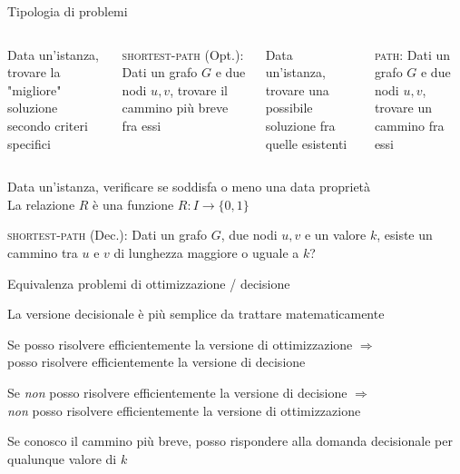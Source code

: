 \begin{frame}{Tipologia di problemi}

\small
\vspace{-9pt}
\begin{columns}[T]
\vspace{-6pt}
\BIL
\item Data un'istanza, trovare la "migliore" soluzione secondo criteri specifici
\item \alert{\textsc{shortest-path} (Opt.)}:
Dati un grafo $G$ e due nodi $u, v$,
trovare il cammino più breve fra essi
\EIL
{}
\vspace{-6pt}
\BIL
\item Data un'istanza, trovare una possibile soluzione fra quelle esistenti
\item \alert{\textsc{path}}: Dati un grafo $G$ e due nodi $u, v$, trovare un
cammino fra essi
\EIL
\end{columns}

\bigskip
{}
\vspace{-6pt}
\BIL
\item Data un'istanza, verificare se soddisfa o meno una data proprietà\\
La relazione $R$ è una funzione $R: I \rightarrow \{ 0, 1 \}$ 
\item \alert{\textsc{shortest-path} (Dec.)}: Dati un grafo $G$, due nodi $u,v$  e un valore $k$, esiste un cammino tra $u$ e $v$ di lunghezza maggiore o uguale a $k$?
\EIL


\end{frame}

\begin{frame}{Equivalenza problemi di ottimizzazione / decisione}

\BIL
\item La versione decisionale è più semplice da trattare matematicamente
\item Se posso risolvere efficientemente la versione di ottimizzazione
$\Rightarrow$ \\ posso risolvere efficientemente la versione di decisione 
\item \alert{Se \emph{non} posso risolvere efficientemente la versione di decisione
$\Rightarrow$ \\ \emph{non} posso risolvere efficientemente la versione di ottimizzazione}
\EIL

\bigskip
{}
\BIL
\item Se conosco il cammino più breve, posso rispondere alla domanda decisionale
per qualunque valore di $k$
\EIL


\end{frame}

